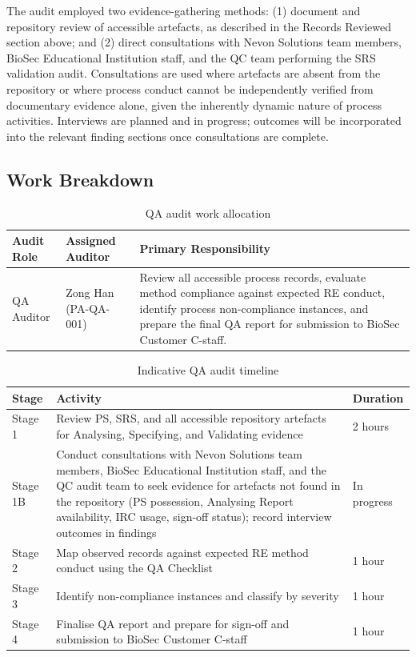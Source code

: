 \documentclass[11pt,a4paper]{article}
\begin{document}
The audit employed two evidence-gathering methods: (1) document and repository review of accessible artefacts, as described in the Records Reviewed section above; and (2) direct consultations with Nevon Solutions team members, BioSec Educational Institution staff, and the QC team performing the SRS validation audit. Consultations are used where artefacts are absent from the repository or where process conduct cannot be independently verified from documentary evidence alone, given the inherently dynamic nature of process activities. Interviews are planned and in progress; outcomes will be incorporated into the relevant finding sections once consultations are complete.

\subsection{Work Breakdown}

\begin{table}[H]
\centering
\small
\renewcommand{\arraystretch}{1.4}
\begin{tabularx}{\textwidth}{|p{}|p{}|X|}
\hline
\rowcolor{tableheader}
\textbf{Audit Role} & \textbf{Assigned Auditor} & \textbf{Primary Responsibility} \\
\hline
QA Auditor & Zong Han (PA-QA-001) & Review all accessible process records, evaluate method compliance against expected RE conduct, identify process non-compliance instances, and prepare the final QA report for submission to BioSec Customer C-staff. \\
\hline
\end{tabularx}
\caption{QA audit work allocation}
\label{tab:qa-wbs}
\end{table}

\begin{table}[H]
\centering
\small
\renewcommand{\arraystretch}{1.4}
\begin{tabularx}{\textwidth}{|p{}|p{}|X|}
\hline
\rowcolor{tableheader}
\textbf{Stage} & \textbf{Activity} & \textbf{Duration} \\
\hline
Stage 1 & Review PS, SRS, and all accessible repository artefacts for Analysing, Specifying, and Validating evidence & 2 hours \\
\hline
Stage 1B & Conduct consultations with Nevon Solutions team members, BioSec Educational Institution staff, and the QC audit team to seek evidence for artefacts not found in the repository (PS possession, Analysing Report availability, IRC usage, sign-off status); record interview outcomes in findings & In progress \\
\hline
Stage 2 & Map observed records against expected RE method conduct using the QA Checklist & 1 hour \\
\hline
Stage 3 & Identify non-compliance instances and classify by severity & 1 hour \\
\hline
Stage 4 & Finalise QA report and prepare for sign-off and submission to BioSec Customer C-staff & 1 hour \\
\hline
\end{tabularx}
\caption{Indicative QA audit timeline}
\label{tab:qa-timeline}
\end{table}
\end{document}
